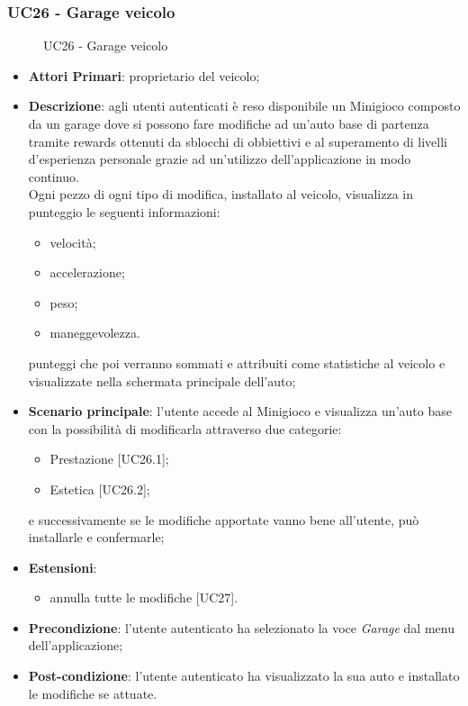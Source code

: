 \subsubsection{UC26 - Garage veicolo}
\begin{figure}[h]
	\centering
	\caption{UC26 - Garage veicolo}
\end{figure}
\begin{itemize}
	\item \textbf{Attori Primari}: proprietario del veicolo;
	\item \textbf{Descrizione}: agli utenti autenticati è reso disponibile un Minigioco composto da un garage dove si possono fare modifiche ad un'auto base di partenza tramite rewards ottenuti da sblocchi di obbiettivi e al superamento di livelli d'esperienza personale grazie ad un'utilizzo dell'applicazione in modo continuo. \\ Ogni pezzo di ogni tipo di modifica, installato al veicolo, visualizza in punteggio le seguenti informazioni:
	\begin{itemize}
		\item velocità;
		\item accelerazione;
		\item peso;
		\item maneggevolezza.
	\end{itemize}
	punteggi che poi verranno sommati e attribuiti come statistiche al veicolo e visualizzate nella schermata principale dell'auto; 
	\item \textbf{Scenario principale}: l'utente accede al Minigioco e visualizza un'auto base con la possibilità di modificarla attraverso due categorie:
	\begin{itemize}
		\item Prestazione [UC26.1];
		\item Estetica [UC26.2];
	\end{itemize}
	e successivamente se le modifiche apportate vanno bene all'utente, può installarle e confermarle;
	\item \textbf{Estensioni}:
	\begin{itemize}
		\item annulla tutte le modifiche [UC27].
	\end{itemize}
	\item \textbf{Precondizione}: l'utente autenticato ha selezionato la voce \textit{Garage} dal menu dell'applicazione;
	\item \textbf{Post-condizione}: l'utente autenticato ha visualizzato la sua auto e installato le modifiche se attuate. 
\end{itemize}

